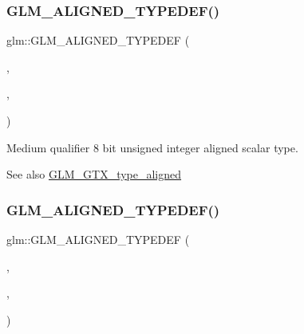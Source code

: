 \subsubsection{\texorpdfstring{G\+L\+M\+\_\+\+A\+L\+I\+G\+N\+E\+D\+\_\+\+T\+Y\+P\+E\+D\+E\+F()}{GLM\_ALIGNED\_TYPEDEF()}\hspace{0.1cm}{\footnotesize\ttfamily [81/209]}}
{\footnotesize\ttfamily glm\+::\+G\+L\+M\+\_\+\+A\+L\+I\+G\+N\+E\+D\+\_\+\+T\+Y\+P\+E\+D\+EF (\begin{DoxyParamCaption}\item[{\mbox{\hyperlink{group__gtc__type__precision_gac4b849eaac0543a10f97f4bdda4850a8}{mediump\+\_\+uint8}}}]{,  }\item[{aligned\+\_\+mediump\+\_\+uint8}]{,  }\item[{1}]{ }\end{DoxyParamCaption})}

Medium qualifier 8 bit unsigned integer aligned scalar type. \begin{DoxySeeAlso}{See also}
\mbox{\hyperlink{group__gtx__type__aligned}{G\+L\+M\+\_\+\+G\+T\+X\+\_\+type\+\_\+aligned}} 
\end{DoxySeeAlso}
\mbox{\label{group__gtx__type__aligned_ga727e2bf2c433bb3b0182605860a48363}} 
\subsubsection{\texorpdfstring{G\+L\+M\+\_\+\+A\+L\+I\+G\+N\+E\+D\+\_\+\+T\+Y\+P\+E\+D\+E\+F()}{GLM\_ALIGNED\_TYPEDEF()}\hspace{0.1cm}{\footnotesize\ttfamily [82/209]}}
{\footnotesize\ttfamily glm\+::\+G\+L\+M\+\_\+\+A\+L\+I\+G\+N\+E\+D\+\_\+\+T\+Y\+P\+E\+D\+EF (\begin{DoxyParamCaption}\item[{\mbox{\hyperlink{group__gtc__type__precision_ga2cef3a0d7b0fce75c9885f64656d8933}{mediump\+\_\+uint16}}}]{,  }\item[{aligned\+\_\+mediump\+\_\+uint16}]{,  }\item[{2}]{ }\end{DoxyParamCaption})}

